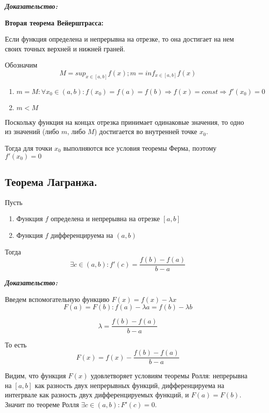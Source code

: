 \documentclass[a4paper,12pt]{article}
\theoremstyle{plain} %
\theoremstyle{definition} %
\theoremstyle{remark} %
\begin{document}
\textit{\textbf{Доказательство:}}

\textbf{Вторая теорема Вейерштрасса:}

Если функция определена и непрерывна на отрезке, то она достигает на нем своих точных верхней и нижней граней.

Обозначим
\[ M = sup_{x \in [a, b]}f(x); m = inf_{x \in [a, b]} f(x) \]

\begin{enumerate}
	\item $m = M: \forall x_0 \in (a, b): f(x_0) = f(a) = f(b) \Rightarrow f(x) = const \Rightarrow f'(x_0) = 0$
	\item $m < M$
\end{enumerate}

Поскольку функция на концах отрезка принимает одинаковые значения, то одно из значений (либо $m$, либо $M$) достигается во внутренней точке $x_0$.

Тогда для точки $x_0$ выполняются все условия теоремы Ферма, поэтому $f'(x_0) = 0$




\newpage
\subsection*{Теорема Лагранжа.                                                                          }

Пусть
\begin{enumerate}
	\item Функция $f$ определена и непрерывна на отрезке $[a, b]$
	\item Функция $f$ дифференцируема на $(a, b)$
\end{enumerate}
Тогда
\[
	\exists c \in (a, b): f'(c) = \frac{f(b) - f(a)}{b - a}
\]

\textit{\textbf{Доказательство:}}

Введем вспомогательную функцию $F(x) = f(x) - \lambda x$
\[
	F(a) = F(b): f(a) - \lambda a = f(b) - \lambda b
\]

\[
	\lambda = \frac{f(b) - f(a)}{b - a}
\]

То есть \[F(x) = f(x) - \frac{f(b) - f(a)}{b - a}\]

Видим, что функция $F(x)$ удовлетворяет условиям теоремы Ролля: непрерывна на $[a, b]$ как разность двух непрерывных функций, дифференцируема на интегрвале как разность двух дифференцируемых функций, и $F(a) = F(b)$. Значит по теореме Ролля $\exists c \in (a, b): F'(c) = 0$.
\end{document}
